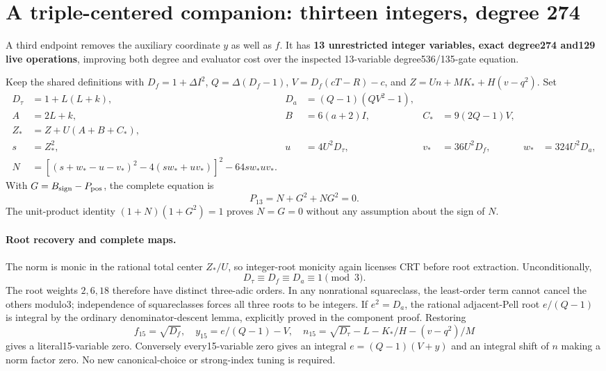 \section{A triple-centered companion: thirteen integers, degree 274}
\label{sec:triple-carrier}
A third endpoint removes the auxiliary coordinate $y$ as well as $f$.
It has \textbf{13 unrestricted integer variables, exact degree274 and129
live operations}, improving both degree and evaluator cost over the inspected
13-variable degree536/135-gate equation.

Keep the shared definitions with $D_f=1+\Delta I^2$, $Q=\Delta(D_f-1)$,
$V=D_f(cT-R)-c$, and $Z=Un+MK_*+H(v-q^2)$.  Set
\begin{align*}
 D_\tau&=1+L(L+k),&D_a&=(Q-1)(QV^2-1),\\
 A&=2L+k,&B&=6(a+2)I,&C_*&=9(2Q-1)V,\\
 Z_*&=Z+U(A+B+C_*),\\
 s&=Z_*^2,&u&=4U^2D_\tau,&v_*&=36U^2D_f,&w_*&=324U^2D_a,\\
 N&=[(s+w_*-u-v_*)^2-4(sw_*+uv_*)]^2-64sw_*uv_*.
\end{align*}
With $G=B_{\rm sign}-P_{\rm pos}$, the complete equation is
\[
 \boxed{P_{13}=N+G^2+NG^2=0.}
\]
The unit-product identity $(1+N)(1+G^2)=1$ proves $N=G=0$ without any
assumption about the sign of $N$.

\paragraph{Root recovery and complete maps.}
The norm is monic in the rational total center $Z_*/U$, so integer-root
monicity again licenses CRT before root extraction.  Unconditionally,
\[
 D_\tau\equiv D_f\equiv D_a\equiv1\pmod3.
\]
The root weights $2,6,18$ therefore have distinct three-adic orders.
In any nonrational squareclass, the least-order term cannot cancel the
others modulo3; independence of squareclasses forces all three roots to be
integers.  If $e^2=D_a$, the rational adjacent-Pell root
$e/(Q-1)$ is integral by the ordinary denominator-descent lemma, explicitly
proved in the component proof.  Restoring
\[
 f_{15}=\sqrt{D_f},\quad
 y_{15}=e/(Q-1)-V,\quad
 n_{15}=\sqrt{D_\tau}-L-K_*/H-(v-q^2)/M
\]
gives a literal15-variable zero.  Conversely every15-variable zero gives
an integral $e=(Q-1)(V+y)$ and an integral shift of $n$ making a norm factor
zero.  No new canonical-choice or strong-index tuning is required.

